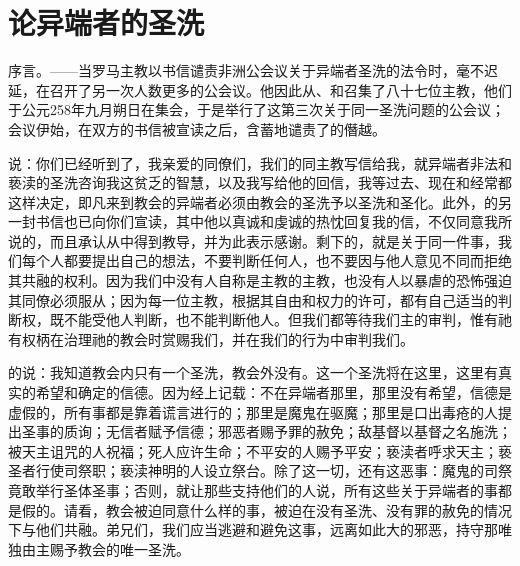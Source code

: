 
\chapter{论异端者的圣洗}


\par

\par

序言。——当罗马主教以书信谴责非洲公会议关于异端者圣洗的法令时，毫不迟延，在召开了另一次人数更多的公会议。他因此从、和召集了八十七位主教，他们于公元258年九月朔日在集会，于是举行了这第三次关于同一圣洗问题的公会议；会议伊始，在双方的书信被宣读之后，含蓄地谴责了的僭越。\par

说：你们已经听到了，我亲爱的同僚们，我们的同主教写信给我，就异端者非法和亵渎的圣洗咨询我这贫乏的智慧，以及我写给他的回信，我等过去、现在和经常都这样决定，即凡来到教会的异端者必须由教会的圣洗予以圣洗和圣化。此外，的另一封书信也已向你们宣读，其中他以真诚和虔诚的热忱回复我的信，不仅同意我所说的，而且承认从中得到教导，并为此表示感谢。剩下的，就是关于同一件事，我们每个人都要提出自己的想法，不要判断任何人，也不要因与他人意见不同而拒绝其共融的权利。因为我们中没有人自称是主教的主教，也没有人以暴虐的恐怖强迫其同僚必须服从；因为每一位主教，根据其自由和权力的许可，都有自己适当的判断权，既不能受他人判断，也不能判断他人。但我们都等待我们主的审判，惟有祂有权柄在治理祂的教会时赏赐我们，并在我们的行为中审判我们。\par

的说：我知道教会内只有一个圣洗，教会外没有。这一个圣洗将在这里，这里有真实的希望和确定的信德。因为经上记载：不在异端者那里，那里没有希望，信德是虚假的，所有事都是靠着谎言进行的；那里是魔鬼在驱魔；那里是口出毒疮的人提出圣事的质询；无信者赋予信德；邪恶者赐予罪的赦免；敌基督以基督之名施洗；被天主诅咒的人祝福；死人应许生命；不平安的人赐予平安；亵渎者呼求天主；亵圣者行使司祭职；亵渎神明的人设立祭台。除了这一切，还有这恶事：魔鬼的司祭竟敢举行圣体圣事；否则，就让那些支持他们的人说，所有这些关于异端者的事都是假的。请看，教会被迫同意什么样的事，被迫在没有圣洗、没有罪的赦免的情况下与他们共融。弟兄们，我们应当逃避和避免这事，远离如此大的邪恶，持守那唯独由主赐予教会的唯一圣洗。\par

